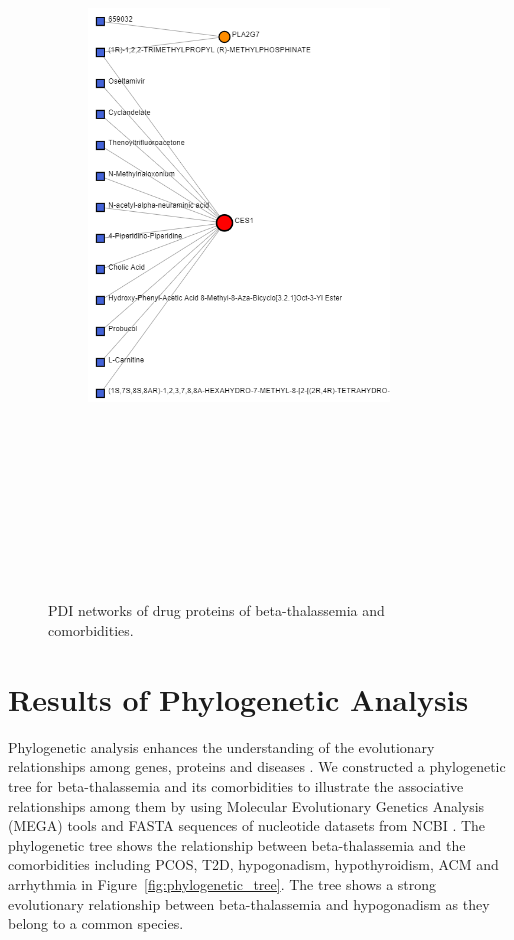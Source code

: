\begin{figure}[H]
\begin{subfigure}[t]{0.48\textwidth}
        \includegraphics[height=20cm, width=8cm]{./fig/fig4_14_2.png}
        \label{fig:subnetwork2}
    \end{subfigure}
    \caption{PDI networks of drug proteins of beta-thalassemia and comorbidities.}
    \label{fig:figure4-14}
\end{figure}


\section{Results of Phylogenetic Analysis}
\label{sec:sec4_8}
Phylogenetic analysis enhances the understanding of the evolutionary relationships among genes, proteins and diseases \cite{8}. We constructed a phylogenetic tree for beta-thalassemia and its comorbidities to illustrate the associative relationships among them by using Molecular Evolutionary Genetics Analysis (MEGA) tools and FASTA sequences of nucleotide datasets from NCBI \cite{8}. The phylogenetic tree shows the relationship between beta-thalassemia and the comorbidities including PCOS, T2D, hypogonadism, hypothyroidism, ACM and arrhythmia in Figure~\ref{fig:phylogenetic_tree}. The tree shows a strong evolutionary relationship between beta-thalassemia and hypogonadism as they belong to a common species.\\

